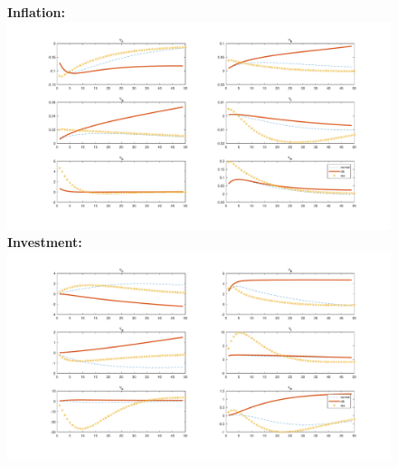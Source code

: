 \documentclass[12pt,reqno]{article}
\numberwithin{equation}{section}
\begin{document}
\begin{figure}[H]
\textbf{Inflation:}\\
\includegraphics[scale=0.5]{AR1_impresp_pinf_reeComp.pdf}
\textbf{Investment:}\\
\includegraphics[scale=0.5]{AR1_impresp_inve_reeComp.pdf}
\end{figure}
\end{document}
